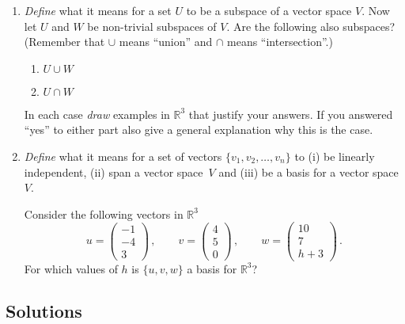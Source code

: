 \begin{enumerate}
\item
{\itshape Define} what it means for a set $U$ to be a subspace of a vector space $V$.
Now let $U$ and $W$ be non-trivial subspaces of $V$. Are the following also subspaces? (Remember that $\cup$ means ``union'' and $\cap$ means ``intersection''.)
\begin{enumerate}
\item $U \cup  W$
\item $U \cap W$ 
\end{enumerate}
In each case {\itshape draw} examples in $\mathbb R^3$ that justify your answers. If you answered ``yes'' to either part also give a general 
explanation why this is the case.

\item
{\itshape Define} what it means for a set of vectors $\{v_1,v_2,\ldots,v_n\}$ to (i) be linearly independent, (ii)
  span a vector space~$V$ and (iii)
 be a basis for a vector space~$V$.

Consider the following vectors in $\mathbb R^3$
\[ u =\begin{pmatrix} -1\\ -4\\ 3 \end{pmatrix}\, ,\qquad
     v =\begin{pmatrix} 4\\ 5\\ 0 \end{pmatrix}\, ,\qquad
    w =\begin{pmatrix} 10\\ 7\\ h+3 \end{pmatrix}\, .
\]
For which values of $h$ is $\{u,v,w\}$ a basis for $\mathbb R^3$?



 \end{enumerate}

\subsection*{Solutions}

